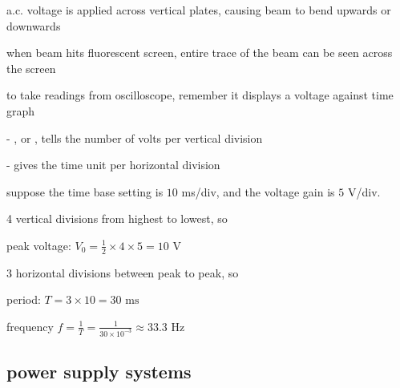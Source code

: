 a.c. voltage is applied across vertical plates, causing beam to bend upwards or downwards

when beam hits fluorescent screen, entire trace of the beam can be seen across the screen

\cmt to take readings from oscilloscope, remember it displays a voltage against time graph

\begin{compactenum}
	\item[-] , or , tells the number of volts per vertical division
	
	\item[-]  gives the time unit per horizontal division
\end{compactenum}




\label{ex-readcro}

\begin{marginfigure}
\centering
{}
\end{marginfigure}

suppose the time base setting is $10$ ms/div, and the voltage gain is $5$ V/div.
 
4 vertical divisions from highest to lowest, so

\eqskip peak voltage: $V_0= \frac{1}{2} \times 4 \times 5 = 10 \text{ V}$

3 horizontal divisions between peak to peak, so

\eqskip period: $T = 3 \times 10 = 30 \text{ ms}$
	
\eqskip frequency $f = \frac{1}{T} = \frac{1}{30\times10^{-3}} \approx 33.3 \text{ Hz} $ \eoe






\subsection{power supply systems}

